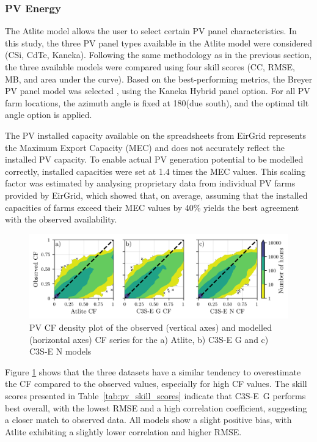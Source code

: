 \documentclass[preprint, 12pt]{elsarticle}
\begin{document}
\newpage
\subsubsection{PV Energy}
\label{sec:pv_verification}

The Atlite model allows the user to select certain PV panel characteristics. In this study, the three PV panel types available in the Atlite model were considered (CSi, CdTe, Kaneka). Following the same methodology as in the previous section, the three available models were compared using four skill scores (CC, RMSE, MB, and area under the curve). Based on the best-performing metrics, the Breyer PV panel model was selected \citep{beyer2004pv}, using the Kaneka Hybrid panel option. For all PV farm locations, the azimuth angle is fixed at 180\textdegree (due south), and the optimal tilt angle option is applied. 

The PV installed capacity available on the spreadsheets from EirGrid represents the Maximum Export Capacity (MEC) and does not accurately reflect the installed PV capacity. To enable actual PV generation potential to be modelled correctly, installed capacities were set at 1.4 times the MEC values. This scaling factor was estimated by analysing proprietary data from individual PV farms provided by EirGrid, which showed that, on average, assuming that the installed capacities of farms exceed their MEC values by 40\% yields the best agreement with the observed availability.

\begin{figure}[h!]
	\centering
	\includegraphics[width=\textwidth]{verification_pv_contour.png}
	\caption{PV CF density plot of the observed (vertical axes) and modelled (horizontal axes) CF series for the a) Atlite, b) C3S-E G and c) C3S-E N models}	
	\label{fig:solar_verification_contour}
\end{figure}

Figure \ref{fig:solar_verification_contour} shows that the three datasets have a similar tendency to overestimate the CF compared to the observed values, especially for high CF values. The skill scores presented in Table~\ref{tab:pv_skill_scores} indicate that C3S-E~G performs best overall, with the lowest RMSE and a high correlation coefficient, suggesting a closer match to observed data. All models show a slight positive bias, with Atlite exhibiting a slightly lower correlation and higher RMSE.
\end{document}
